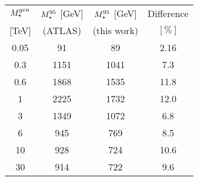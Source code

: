 \begin{table}[!htbp]
\centering
\begin{tabular}{c|c|c|c}
 \hline
 \hline
 $M_{\star}^{\tiny gen}$ & $M_{\star}^{\tiny 95}$ [GeV] & $M_{\star}^{\tiny 95}$ [GeV] & Difference \\
 $[$TeV$]$ & (ATLAS) & (this work) & $[\%]$ \\
 \hline


0.05 & 91 & 89 & 2.16 \\
0.3 & 1151 & 1041 & 7.3 \\
0.6 & 1868 & 1535 & 11.8 \\
1 & 2225 & 1732 & 12.0 \\
3 & 1349 & 1072 & 6.8 \\
6 & 945 & 769 & 8.5 \\
10 & 928 & 724 & 10.6 \\
30 & 914 & 722 & 9.6 \\




\end{tabular}
\end{table}
